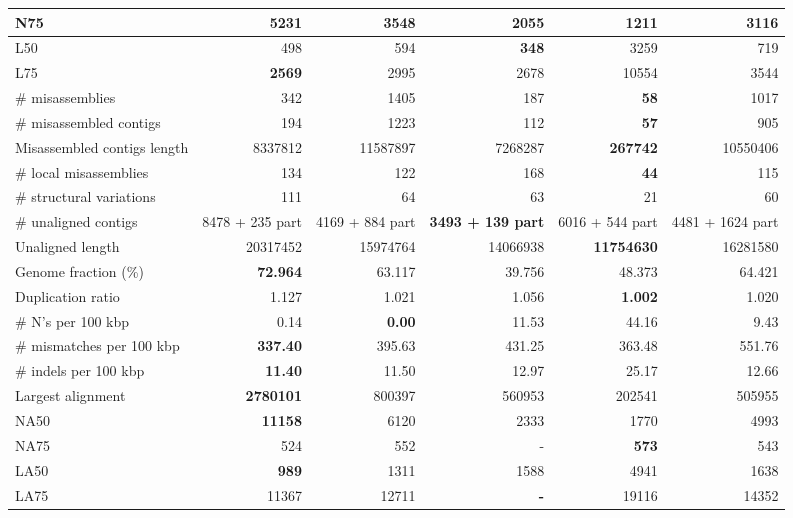 \documentclass[12pt,a4paper]{article}
\begin{document}
\begin{table}[ht]
\begin{center}
\begin{tabular}{|l*{5}{|r}|}
N75 & {\bf 5231} & 3548 & 2055 & 1211 & 3116 \\ \hline
L50 & 498 & 594 & {\bf 348} & 3259 & 719 \\ \hline
L75 & {\bf 2569} & 2995 & 2678 & 10554 & 3544 \\ \hline
\# misassemblies & 342 & 1405 & 187 & {\bf 58} & 1017 \\ \hline
\# misassembled contigs & 194 & 1223 & 112 & {\bf 57} & 905 \\ \hline
Misassembled contigs length & 8337812 & 11587897 & 7268287 & {\bf 267742} & 10550406 \\ \hline
\# local misassemblies & 134 & 122 & 168 & {\bf 44} & 115 \\ \hline
\# structural variations & 111 & 64 & 63 & 21 & 60 \\ \hline
\# unaligned contigs & 8478 + 235 part & 4169 + 884 part & {\bf 3493 + 139 part} & 6016 + 544 part & 4481 + 1624 part \\ \hline
Unaligned length & 20317452 & 15974764 & 14066938 & {\bf 11754630} & 16281580 \\ \hline
Genome fraction (\%) & {\bf 72.964} & 63.117 & 39.756 & 48.373 & 64.421 \\ \hline
Duplication ratio & 1.127 & 1.021 & 1.056 & {\bf 1.002} & 1.020 \\ \hline
\# N's per 100 kbp & 0.14 & {\bf 0.00} & 11.53 & 44.16 & 9.43 \\ \hline
\# mismatches per 100 kbp & {\bf 337.40} & 395.63 & 431.25 & 363.48 & 551.76 \\ \hline
\# indels per 100 kbp & {\bf 11.40} & 11.50 & 12.97 & 25.17 & 12.66 \\ \hline
Largest alignment & {\bf 2780101} & 800397 & 560953 & 202541 & 505955 \\ \hline
NA50 & {\bf 11158} & 6120 & 2333 & 1770 & 4993 \\ \hline
NA75 & 524 & 552 & - & {\bf 573} & 543 \\ \hline
LA50 & {\bf 989} & 1311 & 1588 & 4941 & 1638 \\ \hline
LA75 & 11367 & 12711 & {\bf -} & 19116 & 14352 \\ \hline
\end{tabular}
\end{center}
\end{table}
\end{document}
